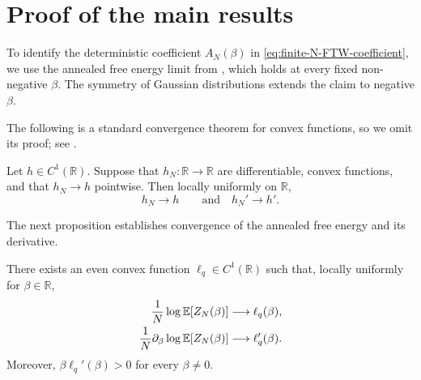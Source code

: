 \documentclass[../CLT_SYK.tex]{subfiles}
\begin{document}
\section{Proof of the main results}
\label{sec:main-results}

To identify the deterministic coefficient $A_N(\beta)$ in
\eqref{eq:finite-N-FTW-coefficient}, we use the annealed free energy limit
from \cite{He2026}, which holds at every fixed non-negative $\beta$. 
The symmetry of Gaussian distributions extends the claim to negative \(\beta\).

The following is a standard convergence theorem for convex functions, {so we omit its proof}; see
\cite[Theorems~10.8 and~25.7]{Rockafellar1970}.

\begin{lemma} \label{lem:convex-derivatives}
Let $h\in C^1(\mathbb R )$. Suppose that $h_N:\mathbb R \to\mathbb R$ are
 differentiable, convex functions, and that $h_N\to h$ pointwise. Then locally uniformly on $\mathbb R $, 
\[
    h_N\to h
    \qquad\text{and}\quad
    h_N'\to h'.
\]

\end{lemma}
{The next proposition establishes convergence of the annealed free energy and its derivative.}
\begin{proposition} \label{prop:annealed-free-energy}
    There exists an even convex function $\ell_q\in C^1(\mathbb R)$ such that,
    locally uniformly for $\beta\in\mathbb R$,
    \begin{align}
        \frac1N\log \mathbb E[Z_N(\beta)]
        &\longrightarrow \ell_q(\beta),
        \label{eq:annealed-free-energy-limit}\\
        \frac1N\partial_\beta\log \mathbb E[Z_N(\beta)]
        &\longrightarrow \ell_q'(\beta).
        \label{eq:annealed-derivative-limit}
    \end{align}
    Moreover, $\beta\ell_q'(\beta)>0$ for every $\beta\neq0$.
\end{proposition}
\end{document}
